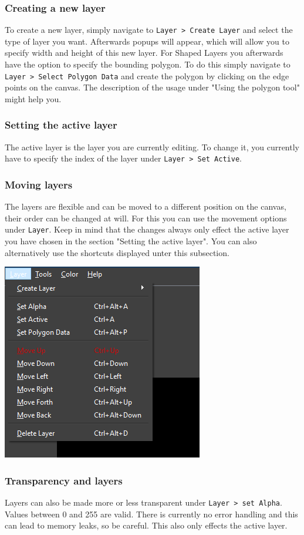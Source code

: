 \documentclass[a4paper, 12pt]{article}
\begin{document}
\subsubsection{Creating a new layer}
To create a new layer, simply navigate to \texttt{Layer > Create Layer} and select the type of layer you want. Afterwards popups will appear, which will allow you to specify width and height of this new layer.
For Shaped Layers you afterwards have the option to specify the bounding polygon. To do this simply navigate to \texttt{Layer > Select Polygon Data} and create the polygon by clicking on the edge points on the canvas. The description of the usage under "Using the polygon tool" might help you.

\subsubsection{Setting the active layer}
The active layer is the layer you are currently editing. To change it, you currently have to specify the index of the layer under \texttt{Layer > Set Active}.

\subsubsection{Moving layers}
The layers are flexible and can be moved to a different position on the canvas, their order can be changed at will. For this you can use the movement options under \texttt{Layer}. Keep in mind that the changes always only effect the active layer you have chosen in the section "Setting the active layer". You can also alternatively use the shortcuts displayed unter this subsection.

\begin{center}
\includegraphics[width=0.3\linewidth,keepaspectratio]{assets/layer-options}
\end{center}

\subsubsection{Transparency and layers}
Layers can also be made more or less transparent under \texttt{Layer > set Alpha}. Values between 0 and 255 are valid. There is currently no error handling and this can lead to memory leaks, so be careful. This also only effects the active layer.
\end{document}
